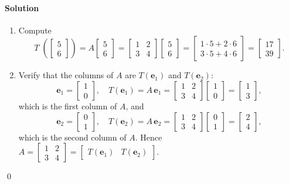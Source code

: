 \documentclass[11pt,openany]{article}
\renewcommand{\vec}[1]{\mathbf{#1}}
\newenvironment{solution}{\paragraph{\color{magenta}Solution}}{}
\begin{document}
\begin{solution}\color{white}
	\begin{enumerate}
		\item Compute
		\[
		T\;\left(\begin{bmatrix}5\\6\end{bmatrix}\right)
		= A
		\begin{bmatrix}5\\6\end{bmatrix}
		= \begin{bmatrix}1&2\\3&4\end{bmatrix}
		\begin{bmatrix}5\\6\end{bmatrix}
		= \begin{bmatrix}1\cdot5 + 2\cdot6\\[6pt]3\cdot5 + 4\cdot6\end{bmatrix}
		= \begin{bmatrix}17\\39\end{bmatrix}.
		\]
		
		\item Verify that the columns of \(A\) are \(T(\vec{e}_1)\) and \(T(\vec{e}_2)\):
		\[
		\vec{e}_1 = \begin{bmatrix}1\\0\end{bmatrix},
		\quad
		T(\vec{e}_1) = A\,\vec{e}_1
		= \begin{bmatrix}1&2\\3&4\end{bmatrix}
		\begin{bmatrix}1\\0\end{bmatrix}
		= \begin{bmatrix}1\\3\end{bmatrix},
		\]
		which is the first column of \(A\), and
		\[
		\vec{e}_2 = \begin{bmatrix}0\\1\end{bmatrix},
		\quad
		T(\vec{e}_2) = A\,\vec{e}_2
		= \begin{bmatrix}1&2\\3&4\end{bmatrix}
		\begin{bmatrix}0\\1\end{bmatrix}
		= \begin{bmatrix}2\\4\end{bmatrix},
		\]
		which is the second column of \(A\).  Hence \(A=\begin{bmatrix}
			1 & 2\\
			3 & 4
		\end{bmatrix}=\begin{bmatrix}T(\vec{e}_1) & T(\vec{e}_2)\end{bmatrix}\).
	\end{enumerate}\color{black}\vfill\hfill\qed
\end{solution}
\end{document}

